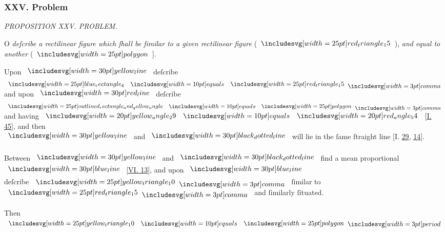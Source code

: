 \documentclass[11pt,preview]{standalone}
\begin{document}
\subsubsection{XXV. Problem}

\begin{minipage}[t]{0.54\textwidth}
    \begin{center}
        \textit{PROPOSITION XXV. PROBLEM.}\label{book6pr25} \\
    \end{center}

    \hfill

    \begin{center}
        \raggedright \lettrine[lines=3, loversize=1, nindent=0pt]{}{}O \textit{deſcribe a rectilinear figure which ſhall be ſimilar to a given rectilinear figure} (\hspace{-1ex}$\img{red_triangle_15}$\hspace{-1ex}), \textit{and equal to another} (\hspace{-1ex}$\img{polygon}$\hspace{-1ex}].
    \end{center}
\end{minipage}%
\hfill
\begin{minipage}[t]{0.43\textwidth}
    \vspace{20pt}
    
\end{minipage}

\hfill

\hfill

\begin{center}
    Upon $\yellowline$ deſcribe $\img{blue_rectangle_4} \bequals \img{red_triangle_15} \bcomma$\\
    and upon $\redline$ deſcribe $\img{outlined_rectangle_and_yellow_angle} \bequals \img{polygon} \bcomma$\\
    and having $\img[0][0][20]{yellow_angle_29} \bequals \img[0][0][20]{red_angle_54}$  [\hyperref[book1pr45]{\textsc{I.} 45}], and then\\
    $\yellowline$ and $\dottedblackline$ will lie in the ſame ſtraight line [\textsc{I.} \hyperref[book1pr29]{29}, \hyperref[book1pr14]{14}].\\
    \hfill\\
    Between $\yellowline$ and $\dottedblackline$ find a mean proportional\\
    $\blueline$ [\hyperref[book6pr13]{\textsc{VI.} 13}], and upon $\blueline$\\
    deſcribe $\img{yellow_triangle_10} \bcomma$ ſimilar to $\img{red_triangle_15} \bcomma$ and ſimilarly ſituated.\\
    \hfill\\
    Then $\img{yellow_triangle_10} \bequals \img{polygon} \bperiod$
\end{center}
\end{document}
